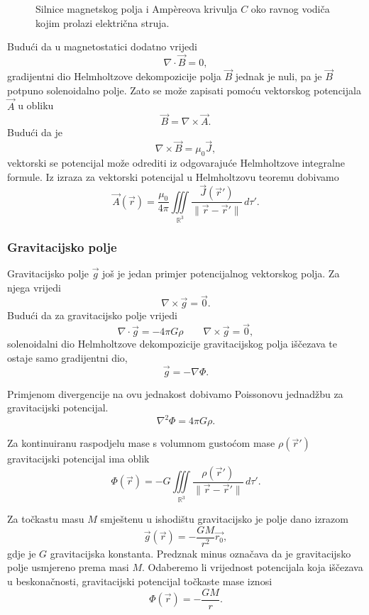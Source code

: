 \documentclass[12pt,a4paper]{article}
\begin{document}
\begin{figure}[H]

    \captionsetup{justification=centering}
    \caption{Silnice magnetskog polja i Ampèreova krivulja $C$
    oko ravnog vodiča kojim prolazi električna struja.}
\end{figure}
Budući da u magnetostatici dodatno vrijedi
$$
\nabla\cdot\overrightarrow{B}=0,
$$
gradijentni dio Helmholtzove dekompozicije polja $\overrightarrow{B}$ jednak je nuli, pa je $\overrightarrow{B}$ potpuno solenoidalno polje.
Zato se može zapisati pomoću vektorskog potencijala $\overrightarrow{A}$ u obliku
$$
\overrightarrow{B}=\nabla\times\overrightarrow{A}.
$$
Budući da je
$$
\nabla\times\overrightarrow{B}=\mu_0\overrightarrow{J},
$$
vektorski se potencijal može odrediti iz odgovarajuće Helmholtzove integralne formule. Iz izraza za vektorski potencijal u Helmholtzovu teoremu dobivamo
$$
\overrightarrow{A}(\overrightarrow{r})
=
\frac{\mu_0}{4\pi}
\iiint\limits_{\mathbb{R}^3}
\frac{\overrightarrow{J}(\overrightarrow{r}')}
{\|\overrightarrow{r}-\overrightarrow{r}'\|}
\,d\tau'.
$$

\subsubsection{Gravitacijsko polje}

Gravitacijsko polje $\overrightarrow{g}$ još je jedan primjer
potencijalnog vektorskog polja. Za njega vrijedi
$$
\nabla\times\overrightarrow{g}=\overrightarrow{0}.
$$
Budući da za gravitacijsko polje vrijedi
$$
\nabla\cdot\overrightarrow{g}=-4\pi G\rho
\qquad
\nabla\times\overrightarrow{g}=\overrightarrow{0},
$$
solenoidalni dio Helmholtzove dekompozicije gravitacijskog polja iščezava te ostaje samo gradijentni dio,
\[
\overrightarrow{g} = -\nabla \Phi.
\]

Primjenom divergencije na ovu jednakost dobivamo Poissonovu jednadžbu za gravitacijski potencijal.
$$
\nabla^2\Phi=4\pi G\rho.
$$

Za kontinuiranu raspodjelu mase s volumnom gustoćom mase
$\rho(\overrightarrow{r}')$ gravitacijski potencijal ima oblik
$$
\Phi(\overrightarrow{r})
=
-G
\iiint\limits_{\mathbb{R}^3}
\frac{\rho(\overrightarrow{r}')}
{\|\overrightarrow{r}-\overrightarrow{r}'\|}
\,d\tau'.
$$

\noindent Za točkastu masu $M$ smještenu u ishodištu gravitacijsko je polje dano
izrazom
$$
\overrightarrow{g}(\overrightarrow{r})
=
-\frac{GM}{r^2}\overrightarrow{r_0},
$$
gdje je $G$ gravitacijska konstanta.
Predznak minus označava da je gravitacijsko polje usmjereno
prema masi $M$.
Odaberemo li vrijednost potencijala koja iščezava u beskonačnosti, gravitacijski
potencijal točkaste mase iznosi
$$
\Phi(\overrightarrow{r})
=
-\frac{GM}{r}.
$$
\end{document}
